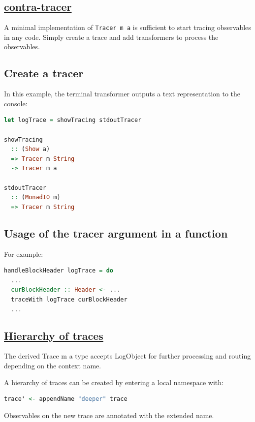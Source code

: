 \begin{mdframed}
    \section*{\href{https://github.com/The-Blockchain-Company/tbco-monitoring-framework/tree/master/contra-tracer}{contra-tracer}}

    A minimal implementation of \texttt{Tracer m a} is sufficient to start tracing observables in any code. Simply create a trace and add transformers to process the observables.

    \subsection*{Create a tracer}

    In this example, the terminal transformer outputs a text representation to the console:

    \begin{lstlisting}[language=Haskell]
let logTrace = showTracing stdoutTracer

showTracing
  :: (Show a)
  => Tracer m String
  -> Tracer m a

stdoutTracer
  :: (MonadIO m)
  => Tracer m String
    \end{lstlisting}

    \subsection*{Usage of the tracer argument in a function}

    For example:

    \begin{lstlisting}[language=Haskell]
handleBlockHeader logTrace = do
  ...
  curBlockHeader :: Header <- ...
  traceWith logTrace curBlockHeader
  ...
    \end{lstlisting}
\end{mdframed}

\begin{mdframed}
    \section*{\href{https://github.com/The-Blockchain-Company/tbco-monitoring-framework/blob/master/tbco-monitoring/src/Bcc/BM/Trace.lhs}{Hierarchy of traces}}

    The derived Trace m a type accepts LogObject for further processing and routing depending on the context name.

    A hierarchy of traces can be created by entering a local namespace with:

    \begin{lstlisting}[language=Haskell]
trace' <- appendName "deeper" trace
    \end{lstlisting}

    Observables on the new trace are annotated with the extended name.
\end{mdframed}

